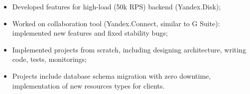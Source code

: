 \begin{itemize}
    \item Developed features for high-load (50k RPS) backend (Yandex.Disk);
    \item Worked on collaboration tool (Yandex.Connect, similar to G Suite): implemented new features and fixed stability bugs;
    \item Implemented projects from scratch, including designing architecture, writing code, tests, monitorings;
    \item Projects include database schema migration with zero downtime, implementation of new resources types for clients.
\end{itemize}
